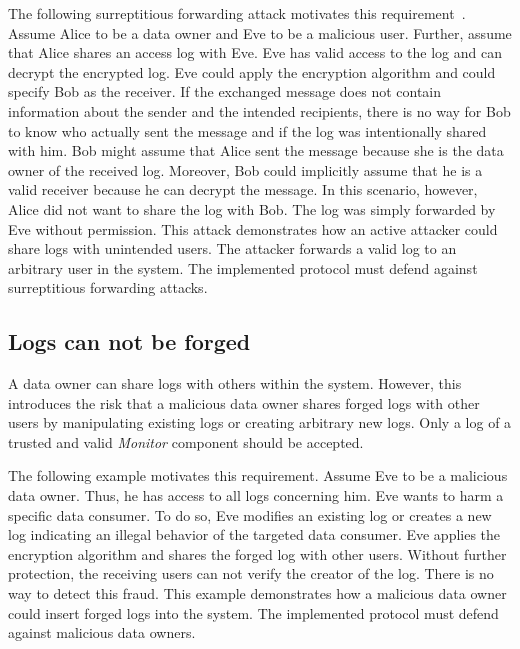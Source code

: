 \documentclass[../main.tex]{subfiles}
\begin{document}
The following surreptitious forwarding attack motivates this requirement~\cite{Davis2001}.
Assume Alice to be a data owner and Eve to be a malicious user.
Further, assume that Alice shares an access log with Eve.
Eve has valid access to the log and can decrypt the encrypted log.
Eve could apply the encryption algorithm and could specify Bob as the receiver.
If the exchanged message does not contain information about the sender and the intended recipients, there is no way for Bob to know who actually sent the message and if the log was intentionally shared with him.
Bob might assume that Alice sent the message because she is the data owner of the received log.
Moreover, Bob could implicitly assume that he is a valid receiver because he can decrypt the message.
In this scenario, however, Alice did not want to share the log with Bob.
The log was simply forwarded by Eve without permission.
This attack demonstrates how an active attacker could share logs with unintended users.
The attacker forwards a valid log to an arbitrary user in the system.
The implemented protocol must defend against surreptitious forwarding attacks.

\subsection{Logs can not be forged}

A data owner can share logs with others within the system.
However, this introduces the risk that a malicious data owner shares forged logs with other users by manipulating existing logs or creating arbitrary new logs.
Only a log of a trusted and valid \emph{Monitor} component should be accepted.

The following example motivates this requirement.
Assume Eve to be a malicious data owner.
Thus, he has access to all logs concerning him.
Eve wants to harm a specific data consumer.
To do so, Eve modifies an existing log or creates a new log indicating an illegal behavior of the targeted data consumer.
Eve applies the encryption algorithm and shares the forged log with other users.
Without further protection, the receiving users can not verify the creator of the log.
There is no way to detect this fraud.
This example demonstrates how a malicious data owner could insert forged logs into the system.
The implemented protocol must defend against malicious data owners.
\end{document}
